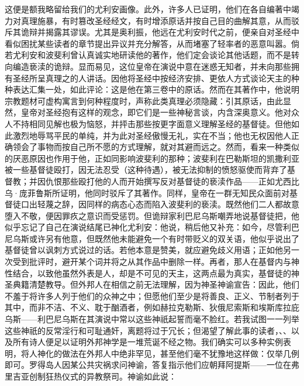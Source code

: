这便是额我略留给我们的尤利安画像。此外，许多人已证明，他们在各自编著中竭力对真理施暴，有时篡改圣经经文，有时增添原话并按自己目的曲解其意，从而驳斥其诡辩并揭露其谬误。尤其是奥利振，他远在尤利安时代之前，便亲自对圣经中看似困扰某些读者的章节提出异议并充分解答，从而堵塞了轻率者的恶意叫嚣。倘若尤利安和波斐利曾认真诚实地研读他的著作，他们定会谈论其他话题，而不是转向编造亵渎的诡辩。显而易见，这位皇帝在演说中意在迷惑无知者，并未向那些拥有圣经所呈真理之的人讲话。因他将圣经中按经济安排、更依人方式谈论天主的种种表达汇集一处，如此评论：这是他在第三卷中的原话。然而在其著作中，他说明宗教题材可虚构寓言到何种程度时，声称此类真理必须隐藏：引其原话，由此显然，皇帝对圣经抱有这样的观念，即它们是一些神秘言谈，内含深奥意义。他对众人不持相同见解也极为恼怒，并抨击那些按更字面意义理解圣经的基督徒。但他如此激烈地辱骂平民的单纯，并为此对圣经傲慢无礼，实在不当；他也无权因他人正确领会了事物而按自己所不愿的方式理解，就对其避而远之。然而，看来一种类似的厌恶原因也作用于他，正如同影响波斐利的那种；波斐利在巴勒斯坦的凯撒利亚被一些基督徒殴打，因无法忍受（这种待遇），被无法抑制的愤怒驱使而背弃了基督教；并因仇恨那些殴打他的人而开始撰写反对基督徒的亵渎作品——正如尤西比乌·庞菲鲁斯所证明，他同时驳斥了其著作。同样，皇帝在一群无知民众面前对基督徒口出轻蔑之辞，因同样的病态心态而陷入波斐利的亵渎。既然他们二人都故意堕入不敬，便因罪疚之意识而受惩罚。但诡辩家利巴尼乌斯嘲弄地说基督徒把，他似乎忘记了自己在演说结尾已神化尤利安：他说，稍后他又补充：如今，尽管利巴尼乌斯或许另有他意，但既然他未能避免一个有时带贬义的双关语，他似乎说出了基督徒曾以讽刺方式说过的话。若他本意是赞美，就应避免歧义用语；正如他另一次受到批评时，避开某个词并将之从其作品中删除一样。再者，那人在基督内与神性结合，以致他虽然外表是人，却是不可见的天主，这两点最为真实，基督徒的神圣典籍清楚教导。但外邦人在相信之前无法理解，因为神圣神谕宣告：因此，他们不羞于将许多人列于他们的众神之中；但愿他们至少是将善良、正义、节制者列于其中，而非不洁、不义、耽于酗酒者，例如赫拉克勒斯、狄俄尼索斯和埃斯库拉庇乌斯——利巴尼乌斯在其演说中常以这些神祇起誓而毫不脸红。若我试图一一列举这些神祇的反常淫行和可耻通奸，离题将过于冗长；但渴望了解此事的读者，、、以及所有诗人便足以证明外邦神学是一堆荒诞不经之物。我们确实可以多种实例表明，将人神化的做法在外邦人中绝非罕见，甚至他们毫不犹豫地这样做：仅举几例即可。罗得岛人因某公共灾祸求问神谕，答复指示他们应朝拜阿提斯——一位在弗里吉亚创制狂热仪式的异教祭司。神谕如此说：\par

